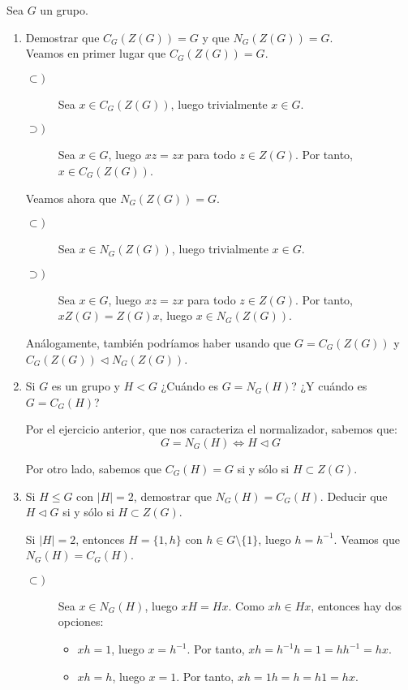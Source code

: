 \begin{ejercicio} Sea $G$ un grupo.
    \begin{enumerate}
        \item Demostrar que $C_G(Z(G))=G$ y que $N_G(Z(G))=G$.\\
        
        Veamos en primer lugar que $C_G(Z(G))=G$.
        \begin{description}
            \item[$\subset)$] Sea $x\in C_G(Z(G))$, luego trivialmente $x\in G$.
            \item[$\supset)$] Sea $x\in G$, luego $xz=zx$ para todo $z\in Z(G)$. Por tanto, $x\in C_G(Z(G))$. 
        \end{description}

        Veamos ahora que $N_G(Z(G))=G$.
        \begin{description}
            \item[$\subset)$] Sea $x\in N_G(Z(G))$, luego trivialmente $x\in G$.
            \item[$\supset)$] Sea $x\in G$, luego $xz=zx$ para todo $z\in Z(G)$. Por tanto, $xZ(G)=Z(G)x$, luego $x\in N_G(Z(G))$.
        \end{description}
        Análogamente, también podríamos haber usando que $G=C_G(Z(G))$ y $C_G(Z(G))\lhd N_G(Z(G))$.
        \item Si $G$ es un grupo y $H<G$ ¿Cuándo es $G=N_G(H)$? ¿Y cuándo es $G=C_G(H)$?
        
        Por el ejercicio anterior, que nos caracteriza el normalizador, sabemos que:
        \begin{equation*}
            G=N_G(H) \Longleftrightarrow H\lhd G
        \end{equation*}

        Por otro lado, sabemos que $C_G(H)=G$ si y sólo si $H\subset Z(G)$.
        \item Si $H\leq G$ con $|H|=2$, demostrar que $N_G(H)=C_G(H)$. Deducir que $H\lhd G$ si y sólo si $H\subset Z(G)$.
        
        Si $|H|=2$, entonces $H=\{1,h\}$ con $h\in G\setminus \{1\}$, luego $h=h^{-1}$. Veamos que $N_G(H)=C_G(H)$.
        \begin{description}
            \item[$\subset)$] Sea $x\in N_G(H)$, luego $xH=Hx$. Como $xh\in Hx$, entonces hay dos opciones:
            \begin{itemize}
                \item $xh=1$, luego $x=h^{-1}$. Por tanto, $xh=h^{-1}h=1=hh^{-1}=hx$.
                \item $xh=h$, luego $x=1$. Por tanto, $xh=1h=h=h1=hx$.
            \end{itemize}


\end{description}
\end{enumerate}
\end{ejercicio}
